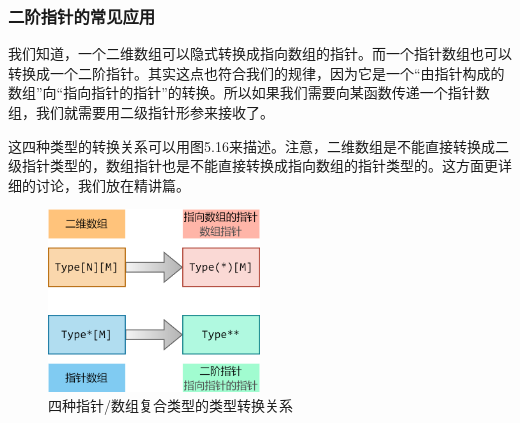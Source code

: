 \subsubsection*{二阶指针的常见应用}
我们知道，一个二维数组可以隐式转换成指向数组的指针。而一个指针数组也可以转换成一个二阶指针。其实这点也符合我们的规律，因为它是一个``由指针构成的数组''向``指向指针的指针''的转换。所以如果我们需要向某函数传递一个指针数组，我们就需要用二级指针形参来接收了。\par
这四种类型的转换关系可以用图5.16来描述。注意，二维数组是不能直接转换成二级指针类型的，数组指针也是不能直接转换成指向数组的指针类型的。这方面更详细的讨论，我们放在精讲篇。\par
\begin{figure}[htbp]
    \centering
    \includegraphics[width=0.5\textwidth]{../images/generalized_parts/05_type_conversions_between_array_and_pointer.drawio.png}
    \caption{四种指针/数组复合类型的类型转换关系}
\end{figure}\par
